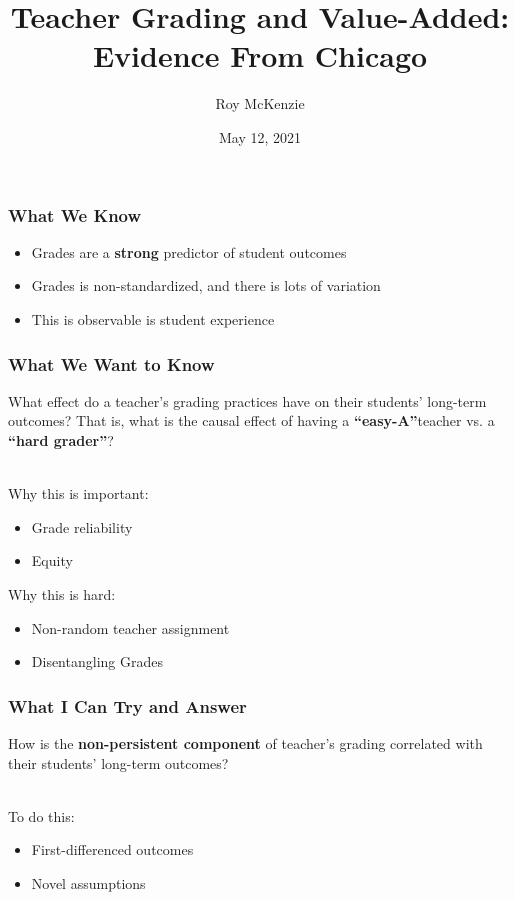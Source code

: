 \documentclass{beamer}
\title{Teacher Grading and Value-Added: \\ Evidence From Chicago}
\author{Roy McKenzie}
\institute{University of Chicago - Department of Economics}
\date{May 12, 2021}
\begin{document}
\frame{\titlepage}

\begin{frame}
\frametitle{What We Know}
\begin{itemize}
	\item Grades are a \textbf{strong} predictor of student outcomes 
	\item Grades is non-standardized, and there is lots of variation
	\item This is observable is student experience 
\end{itemize}
\end{frame}

\begin{frame}
\frametitle{What We Want to Know}
What effect do a teacher’s grading practices have on their students’ long-term outcomes? That is, what is the causal effect of having a \textbf{``easy-A''}teacher vs. a \textbf{``hard grader''}? \\~\\ \pause

Why this is important: \pause
\begin{itemize}
	\item Grade reliability \pause
	\item Equity 
\end{itemize}

Why this is hard: \pause
\begin{itemize}
	\item Non-random teacher assignment \pause
	\item Disentangling Grades
\end{itemize}
\end{frame}

\begin{frame}
\frametitle{What I Can Try and Answer}
How is the \textbf{non-persistent component} of teacher's grading correlated with their students' long-term outcomes? \\~\\ \pause

To do this:
\begin{itemize}
	\item First-differenced outcomes \pause
	\item Novel assumptions
\end{itemize}
\end{frame}
\end{document}
